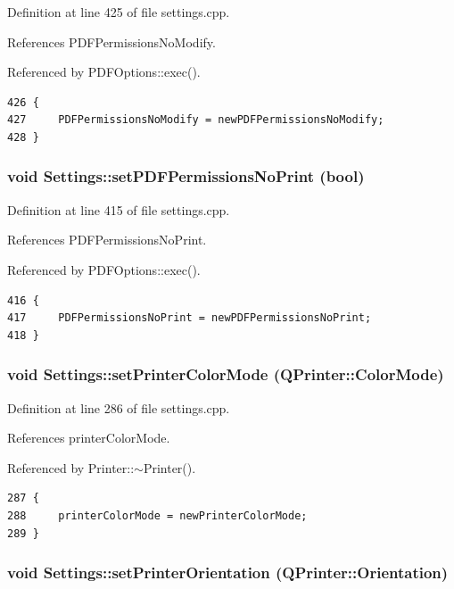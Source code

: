 Definition at line 425 of file settings.cpp.

References PDFPermissions\-No\-Modify.

Referenced by PDFOptions::exec().

\footnotesize\begin{verbatim}426 {
427     PDFPermissionsNoModify = newPDFPermissionsNoModify;
428 }
\end{verbatim}\normalsize 


\hypertarget{classSettings_a51}{
\subsubsection[setPDFPermissionsNoPrint]{\setlength{\rightskip}{0pt plus 5cm}void Settings::set\-PDFPermissions\-No\-Print (bool)}}
\label{classSettings_a51}


Definition at line 415 of file settings.cpp.

References PDFPermissions\-No\-Print.

Referenced by PDFOptions::exec().

\footnotesize\begin{verbatim}416 {
417     PDFPermissionsNoPrint = newPDFPermissionsNoPrint;
418 }
\end{verbatim}\normalsize 


\hypertarget{classSettings_a34}{
\subsubsection[setPrinterColorMode]{\setlength{\rightskip}{0pt plus 5cm}void Settings::set\-Printer\-Color\-Mode (QPrinter::Color\-Mode)}}
\label{classSettings_a34}


Definition at line 286 of file settings.cpp.

References printer\-Color\-Mode.

Referenced by Printer::$\sim$Printer().

\footnotesize\begin{verbatim}287 {
288     printerColorMode = newPrinterColorMode;
289 }
\end{verbatim}\normalsize 


\hypertarget{classSettings_a28}{
\subsubsection[setPrinterOrientation]{\setlength{\rightskip}{0pt plus 5cm}void Settings::set\-Printer\-Orientation (QPrinter::Orientation)}}
\label{classSettings_a28}


